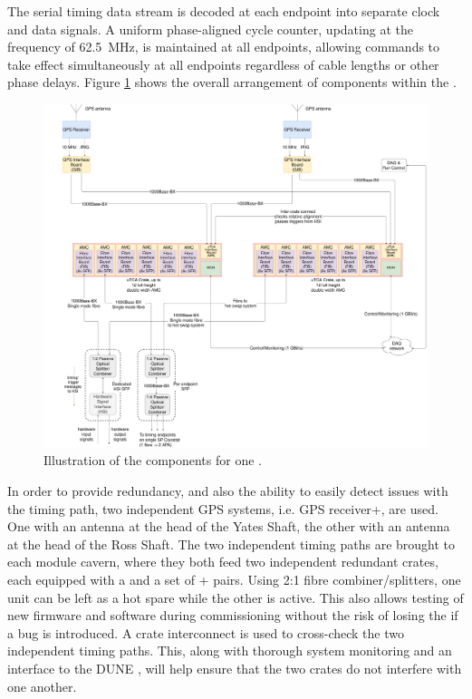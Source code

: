 \documentclass{dune}
\begin{document}
The serial timing data stream is decoded at each endpoint into separate clock and data signals. A uniform phase-aligned cycle counter, updating at the  frequency of \SI{62.5}{\MHz}, is maintained at all endpoints, allowing commands to take effect simultaneously at all endpoints regardless of cable lengths or other phase delays. Figure \ref{fig:daq-readout-timing} shows the overall arrangement of components within the .

\begin{figure}[h]
\includegraphics[width=\textwidth]{DUNE_SP_Timing_DAQ_on_CryoM_GPS_In_CUC_01april20.pdf}
\caption{Illustration of the  components for one .}
\label{fig:daq-readout-timing}
\end{figure}

In order to provide redundancy, and also the ability to easily detect issues with the timing path, two independent GPS systems, i.e. GPS receiver+, are used. One with an antenna at the head of the Yates Shaft, the other with an antenna at the head of the Ross Shaft. The two independent timing paths are brought to each module cavern, where they both feed two independent redundant  crates, each equipped with a  and a set of + pairs. Using 2:1 fibre combiner/splitters, one  unit can be left as a hot spare while the other is active. This also allows testing of new firmware and software during commissioning without the risk of losing the  if a bug is introduced. A  crate interconnect is used to cross-check the two independent timing paths. This, along with thorough system monitoring and an interface to the DUNE , will help ensure that the two  crates do not interfere with one another.
\end{document}
